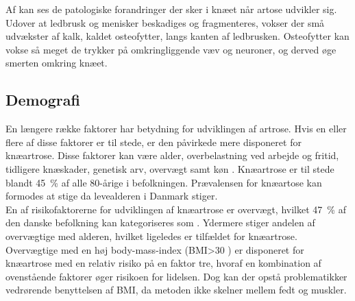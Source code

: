 Af  kan ses de patologiske forandringer der sker i knæet når artose udvikler sig. Udover at ledbrusk og menisker beskadiges og fragmenteres, vokser der små udvækster af kalk, kaldet osteofytter, langs kanten af ledbrusken. Osteofytter kan vokse så meget de trykker på omkringliggende væv og neuroner, og derved øge smerten omkring knæet. \citep{schroder}

\subsection{Demografi}
En længere række faktorer har betydning for udviklingen af artrose. Hvis en eller flere af disse faktorer er til stede, er den påvirkede mere disponeret for knæartrose. Disse faktorer kan være alder, overbelastning ved arbejde og fritid, tidligere knæskader, genetisk arv, overvægt samt køn \citep{brostrom2012}. Knæartrose er til stede blandt 45~\% af alle 80-årige i befolkningen. Prævalensen for knæartose kan formodes at stige da levealderen i Danmark stiger. \\
En af risikofaktorerne for udviklingen af knæartrose er overvægt, hvilket 47~\% af den danske befolkning kan kategoriseres som \citep{Vestergaard2016}. Ydermere stiger andelen af overvægtige med alderen, hvilket ligeledes er tilfældet for knæartrose. Overvægtige med en høj body-mass-index (BMI>30 \citep{definitionfedme1999}) er disponeret for knæartrose med en relativ risiko på en faktor tre, hvoraf en kombination af ovenstående faktorer øger risikoen for lidelsen. Dog kan der opstå problematikker vedrørende benyttelsen af BMI, da metoden ikke skelner mellem fedt og muskler. \citep{brostrom2012} \citep{Lind2016b}





